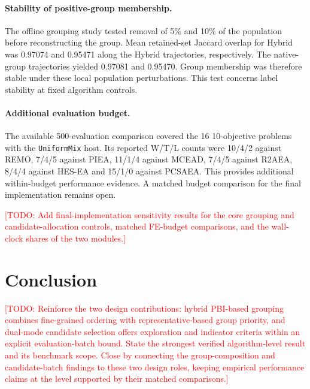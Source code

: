 \documentclass[final,5p,times,twocolumn]{elsarticle}
\newcommand{\TODO}[1]{\textcolor{red}{[TODO: #1]}}
\begin{document}
\paragraph{Stability of positive-group membership.}
The offline grouping study tested removal of 5\% and 10\% of the
population before reconstructing the group. Mean retained-set Jaccard
overlap for Hybrid was 0.97074 and 0.95471 along the Hybrid trajectories,
respectively. The native-group trajectories yielded 0.97081 and
0.95470. Group membership was therefore stable under these local
population perturbations. This test concerns label stability at fixed
algorithm controls.

\paragraph{Additional evaluation budget.}
The available 500-evaluation comparison covered the 16 10-objective
problems with the \texttt{UniformMix} host. Its reported W/T/L counts
were 10/4/2 against REMO, 7/4/5 against PIEA, 11/1/4 against MCEAD,
7/4/5 against R2AEA, 8/4/4 against HES-EA and 15/1/0 against PCSAEA.
This provides additional within-budget performance evidence. A
matched budget comparison for the final implementation remains open.

\TODO{Add final-implementation sensitivity results for the core
grouping and candidate-allocation controls, matched FE-budget comparisons,
and the wall-clock shares of the two modules.}

\clearpage

\section{Conclusion}
\label{sec:conclusion}
\TODO{Reinforce the two design contributions: hybrid PBI-based grouping combines
fine-grained ordering with representative-based group priority, and dual-mode
candidate selection offers exploration and indicator criteria within an
explicit evaluation-batch bound. State the strongest verified algorithm-level
result and its benchmark scope. Close by connecting the group-composition and
candidate-batch findings to these two design roles, keeping empirical performance
claims at the level supported by their matched comparisons.}
\end{document}
